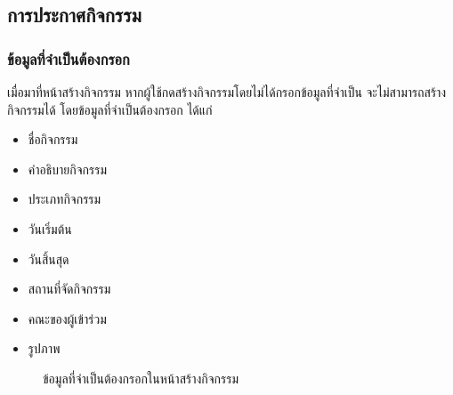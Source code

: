 \subsection{การประกาศกิจกรรม}
\subsubsection{ข้อมูลที่จำเป็นต้องกรอก}
เมื่อมาที่หน้าสร้างกิจกรรม หากผู้ใช้กดสร้างกิจกรรมโดยไม่ได้กรอกข้อมูลที่จำเป็น จะไม่สามารถสร้างกิจกรรมได้ โดยข้อมูลที่จำเป็นต้องกรอก ได้แก่
\begin{itemize}
    \item ชื่อกิจกรรม
    \item คำอธิบายกิจกรรม
    \item ประเภทกิจกรรม
    \item วันเริ่มต้น
    \item วันสิ้นสุด
    \item สถานที่จัดกิจกรรม
    \item คณะของผู้เข้าร่วม
    \item รูปภาพ
\end{itemize}
\begin{figure}[H]
    \begin{center}
    \end{center}
    \caption[ผลทดลองข้อมูลที่จำเป็นต้องกรอก]{ข้อมูลที่จำเป็นต้องกรอกในหน้าสร้างกิจกรรม}
    \label{fig:create-required}
\end{figure}
